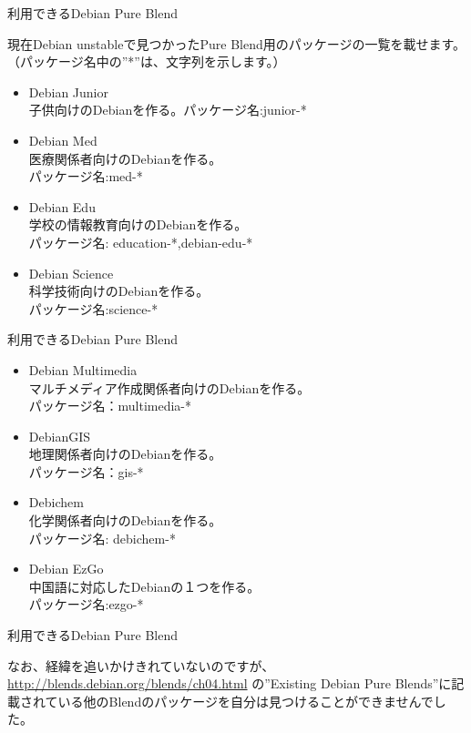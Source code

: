 \begin{frame}{利用できるDebian Pure Blend}

 現在Debian unstableで見つかったPure Blend用のパッケージの一覧を載せます。
（パッケージ名中の''*''は、文字列を示します。）
\begin{itemize}
\item Debian Junior\\
子供向けのDebianを作る。パッケージ名:junior-* 
\item Debian Med\\
医療関係者向けのDebianを作る。\\
パッケージ名:med-* 
\item Debian Edu\\
学校の情報教育向けのDebianを作る。\\
パッケージ名: education-*,debian-edu-* 
\item Debian Science \\
科学技術向けのDebianを作る。\\
パッケージ名:science-* 
\end{itemize}

\end{frame}

\begin{frame}{利用できるDebian Pure Blend}

\begin{itemize}
\item Debian Multimedia \\
マルチメディア作成関係者向けのDebianを作る。\\
パッケージ名：multimedia-* 
\item DebianGIS \\
地理関係者向けのDebianを作る。\\
パッケージ名：gis-*
\item Debichem \\
化学関係者向けのDebianを作る。\\
パッケージ名: debichem-* 
\item Debian EzGo\\
中国語に対応したDebianの１つを作る。\\
パッケージ名:ezgo-* 
\end{itemize}

\end{frame}

\begin{frame}{利用できるDebian Pure Blend}

 なお、経緯を追いかけきれていないのですが、
\url{http://blends.debian.org/blends/ch04.html}
の''Existing Debian Pure Blends''に記載されている他のBlendのパッケージを自分は見つけることができませんでした。\\
\end{frame}

